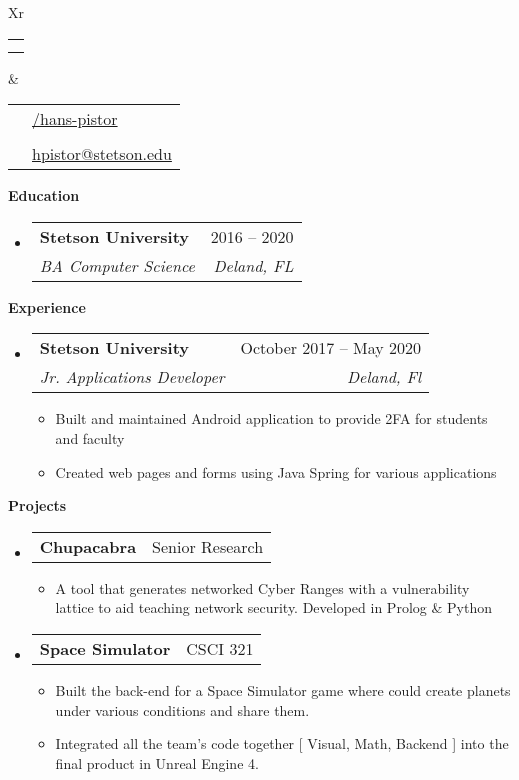 \documentclass[letterpaper,12pt]{article}[leftmargin=*]
\makeatletter
\def \fullname {Hans Pistor}
\def \subtitle {}
\def \phoneicon {\faPhone}
\def \phonetext {+1-407-443-5855}
\def \emailicon {\faEnvelope}
\def \emaillink {mailto:hpistor@stetson.edu}
\def \emailtext {hpistor@stetson.edu}
\def \githubicon {\faGithub}
\def \githublink {https://github.com/hans-pistor}
\def \githubtext {/hans-pistor}
\def \headertype {\doublecol} %
\def \entryspacing {-0pt}
\def \phone {\phoneicon \hspace{3pt}{ \phonetext}}
\def \email {\emailicon \hspace{3pt}\href{\emaillink}{\emailtext}}
\def \github {\githubicon \hspace{3pt}\href{\githublink}{\githubtext}}
\renewcommand{\section}[2]{\vspace{5pt}
  \colorbox{secondary}{\color{white}\raggedbottom\normalsize\textbf{{#1}{\hspace{7pt}#2}}}
}
\newcommand{\resumeEntryStart}{\begin{itemize}[leftmargin=2.5mm]}
\newcommand{\resumeEntryEnd}{\end{itemize}\vspace{\entryspacing}}
\newcommand{\resumeItemListStart}{\begin{itemize}[leftmargin=4.5mm]}
\newcommand{\resumeItemListEnd}{\end{itemize}}
\newcommand{\resumeItem}[1]{
  \item\small{
    {#1 \vspace{-2pt}}
  }
}
\newcommand{\resumeEntryTSDL}[4]{
  \vspace{-1pt}\item[]
    \begin{tabularx}{0.97\textwidth}{X@{\hspace{60pt}}r}
      \textbf{\color{primary}#1} & {\firabook\color{accent}\small#2} \\
      \textit{\color{accent}\small#3} & \textit{\color{accent}\small#4} \\
    \end{tabularx}\vspace{-6pt}
}
\newcommand{\resumeEntryTD}[2]{
  \vspace{-1pt}\item[]
    \begin{tabularx}{0.97\textwidth}{X@{\hspace{60pt}}r}
      \textbf{\color{primary}#1} & {\firabook\color{accent}\small#2} \\
    \end{tabularx}\vspace{-6pt}
}
\newcommand{\doublecol}[6]{
  \begin{tabularx}{\textwidth}{Xr}
    {
      \begin{tabular}[c]{l}
        \fontsize{35}{45}\selectfont{\color{primary}{{\textbf{\fullname}}}} \\
        {\textit{\subtitle}} %
      \end{tabular}
    } & {
      \begin{tabular}[c]{l@{\hspace{1.5em}}l}
        {\small#4} & {\small#1} \\
        {\small#5} & {\small#2} \\
        {\small#6} & {\small#3}
      \end{tabular}
    }
  \end{tabularx}
}
\newcommand{\singlecol}[6]{
  \begin{tabularx}{\textwidth}{Xr}
    {
      \begin{tabular}[b]{l}
        \fontsize{35}{45}\selectfont{\color{primary}{{\textbf{\fullname}}}} \\
        {\textit{\subtitle}} %
      \end{tabular}
    } & {
      \begin{tabular}[c]{l}
        {\small#1} \\
        {\small#2} \\
        {\small#3} \\
        {\small#4} \\
        {\small#5} \\
        {\small#6}
      \end{tabular}
    }
  \end{tabularx}
}
\makeatother
\begin{document}


\headertype{\github}{\phone}{\email}{}{}{} %
\vspace{-10pt} %

\section{\faGraduationCap}{Education}

  \resumeEntryStart
    \resumeEntryTSDL
      {Stetson University}{2016 -- 2020}
      {BA Computer Science}{Deland, FL}
  \resumeEntryEnd

\section{\faPieChart}{Experience}

  \resumeEntryStart
    \resumeEntryTSDL
      {Stetson University}{October 2017 -- May 2020}
      {Jr. Applications Developer}{Deland, Fl}
    \resumeItemListStart
      \resumeItem {Built and maintained Android application to provide 2FA for students and faculty}
      \resumeItem {Created web pages and forms using Java Spring for various applications}
    \resumeItemListEnd
  \resumeEntryEnd



\section{\faFlask}{Projects}

  \resumeEntryStart
    \resumeEntryTD
      {Chupacabra}{Senior Research}
    \resumeItemListStart
      \resumeItem {A tool that generates networked Cyber Ranges with a vulnerability lattice to aid teaching network security. Developed in Prolog \& Python}
    \resumeItemListEnd
  \resumeEntryEnd

  \resumeEntryStart
    \resumeEntryTD
      {Space Simulator}{CSCI 321}
    \resumeItemListStart
      \resumeItem {Built the back-end for a Space Simulator game where could create planets under various conditions and share them.}
      \resumeItem {Integrated all the team's code together [ Visual, Math, Backend ] into the final product in Unreal Engine 4.}
    \resumeItemListEnd
  \resumeEntryEnd
\end{document}
